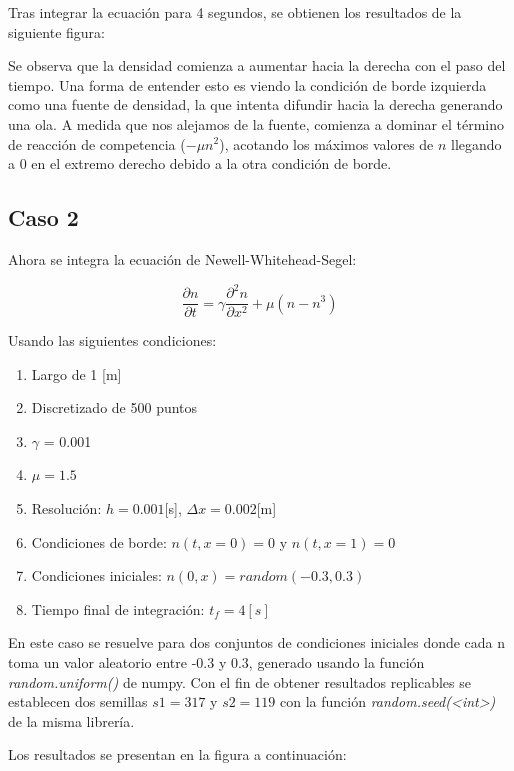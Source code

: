 \documentclass{article}
\begin{document}
Tras integrar la ecuación para 4 segundos, se obtienen los resultados de la siguiente figura:



Se observa que la densidad comienza a aumentar hacia la derecha con el paso del tiempo. Una forma de entender esto es viendo la condición de borde izquierda como una fuente de densidad, la que intenta difundir hacia la derecha generando una ola. A medida que nos alejamos de la fuente, comienza a dominar el término de reacción de competencia ($-\mu n^2$), acotando los máximos valores de $n$ llegando a 0 en el extremo derecho debido a la otra condición de borde.

\subsection{Caso 2}

Ahora se integra la ecuación de Newell-Whitehead-Segel:

\begin{equation}
  \frac{\partial n}{\partial t} = \gamma \frac{\partial^2n}{\partial x^2} + \mu ( n - n^3 )
\end{equation}

Usando las siguientes condiciones:

\begin{enumerate}
  \item Largo de 1 [m]
  \item Discretizado de 500 puntos
  \item $\gamma$ = 0.001
  \item $\mu  = 1.5$
  \item Resolución: $h = 0.001$[s], $\Delta x = 0.002$[m]
  \item Condiciones de borde: $n(t, x=0) = 0$ y $n(t, x=1) = 0$
  \item Condiciones iniciales: $ n(0, x) = random(-0.3,0.3) $
  \item Tiempo final de integración: $t_f = 4[s]$
\end{enumerate}

En este caso se resuelve para dos conjuntos de condiciones iniciales donde cada n toma un valor aleatorio entre -0.3 y 0.3, generado usando la función \emph{random.uniform()} de numpy. Con el fin de obtener resultados replicables se establecen dos semillas $s1 = 317$ y $s2 = 119$ con la función \emph{random.seed(<int>)} de la misma librería.

Los resultados se presentan en la figura a continuación:
\end{document}
